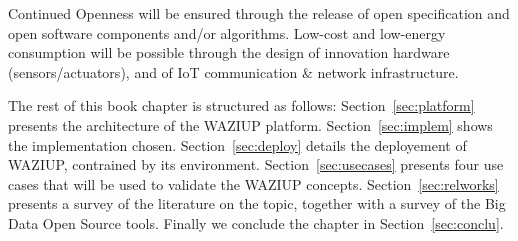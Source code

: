Continued Openness will be ensured through the release of open specification and open software components and/or algorithms.
Low-cost and low-energy consumption will be possible through the design of innovation hardware (sensors/actuators), and of IoT communication \& network infrastructure.

The rest of this book chapter is structured as follows: Section~\ref{sec:platform} presents the architecture of the WAZIUP platform. 
Section~\ref{sec:implem} shows the implementation chosen. 
Section~\ref{sec:deploy} details the deployement of WAZIUP, contrained by its environment.
Section~\ref{sec:usecases} presents four use cases that will be used to validate the WAZIUP concepts.
Section~\ref{sec:relworks} presents a survey of the literature on the topic, together with a survey of the Big Data Open Source tools.
Finally we conclude the chapter in Section~\ref{sec:conclu}.
